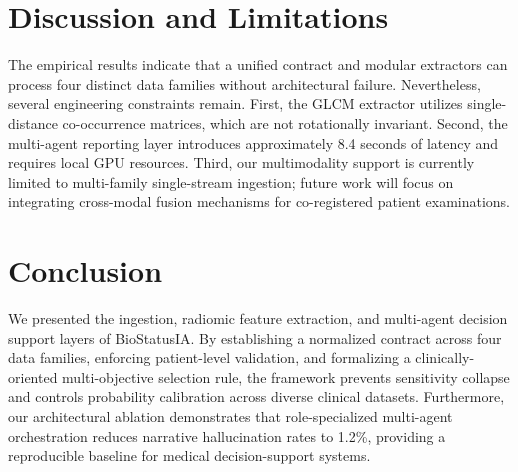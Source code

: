 \documentclass[conference]{IEEEtran}
\begin{document}
\section{Discussion and Limitations}
The empirical results indicate that a unified contract and modular extractors can process four distinct data families without architectural failure. Nevertheless, several engineering constraints remain. First, the GLCM extractor utilizes single-distance co-occurrence matrices, which are not rotationally invariant. Second, the multi-agent reporting layer introduces approximately 8.4 seconds of latency and requires local GPU resources. Third, our multimodality support is currently limited to multi-family single-stream ingestion; future work will focus on integrating cross-modal fusion mechanisms for co-registered patient examinations.

\section{Conclusion}
We presented the ingestion, radiomic feature extraction, and multi-agent decision support layers of BioStatusIA. By establishing a normalized contract across four data families, enforcing patient-level validation, and formalizing a clinically-oriented multi-objective selection rule, the framework prevents sensitivity collapse and controls probability calibration across diverse clinical datasets. Furthermore, our architectural ablation demonstrates that role-specialized multi-agent orchestration reduces narrative hallucination rates to 1.2\%, providing a reproducible baseline for medical decision-support systems.
\end{document}
